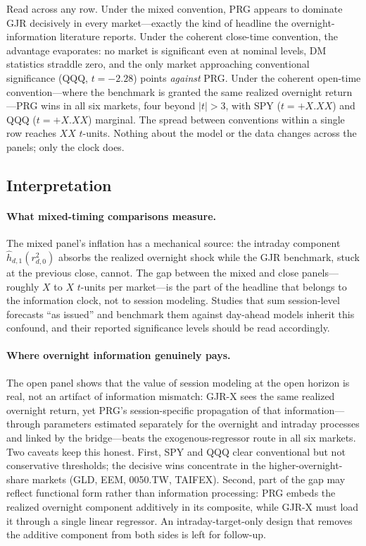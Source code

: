 \documentclass[11pt,a4paper]{article}
\begin{document}
Read across any row. Under the mixed convention, PRG appears to dominate GJR decisively in every market---exactly the kind of headline the overnight-information literature reports. Under the coherent close-time convention, the advantage evaporates: no market is significant even at nominal levels, DM statistics straddle zero, and the only market approaching conventional significance (QQQ, $t=-2.28$) points \emph{against} PRG. Under the coherent open-time convention---where the benchmark is granted the same realized overnight return---PRG wins in all six markets, four beyond $|t|>3$, with SPY
($t=+X.XX$) and QQQ ($t=+X.XX$)
marginal. The spread between conventions within a single row reaches
$XX$
$t$-units. Nothing about the model or the data changes across the panels; only the clock does.

\subsection{Interpretation}

\paragraph{What mixed-timing comparisons measure.} The mixed panel's inflation has a mechanical source: the intraday component $\hat{h}_{d,1}(r^2_{d,0})$ absorbs the realized overnight shock while the GJR benchmark, stuck at the previous close, cannot. The gap between the mixed and close panels---roughly
$X$ to $X$
$t$-units per market---is the part of the headline that belongs to the information clock, not to session modeling. Studies that sum session-level forecasts ``as issued'' and benchmark them against day-ahead models inherit this confound, and their reported significance levels should be read accordingly.

\paragraph{Where overnight information genuinely pays.} The open panel shows that the value of session modeling at the open horizon is real, not an artifact of information mismatch: GJR-X sees the same realized overnight return, yet PRG's session-specific propagation of that information---through parameters estimated separately for the overnight and intraday processes and linked by the bridge---beats the exogenous-regressor route in all six markets. Two caveats keep this honest. First, SPY and QQQ clear conventional but not conservative thresholds; the decisive wins concentrate in the higher-overnight-share markets (GLD, EEM, 0050.TW, TAIFEX). Second, part of the gap may reflect functional form rather than information processing: PRG embeds the realized overnight component additively in its composite, while GJR-X must load it through a single linear regressor. An intraday-target-only design that removes the additive component from both sides is left for follow-up.
\end{document}
